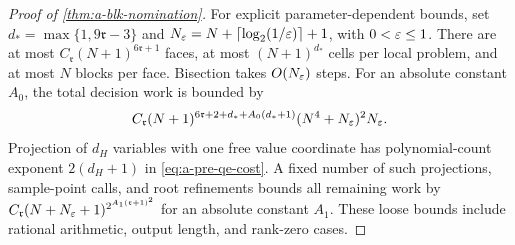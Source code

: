 \begin{proof}[Proof of \cref{thm:a-blk-nomination}]
For explicit parameter-dependent bounds, set
$d_* =\max\{1,9\mathfrak r-3\}$ and
$N_\varepsilon=N+\lceil\log_2(1/\varepsilon)\rceil+1$, with $0<\varepsilon\le1$.
There are at most $C_{\mathfrak r}(N+1)^{6\mathfrak r+1}$ faces,
at most $(N+1)^{d_*}$ cells per local problem, and at most $N$ blocks
per face. Bisection takes $O(N_\varepsilon)$ steps. For an absolute constant
$A_0$, the total decision work is bounded by
\[
 C_{\mathfrak r}(N+1)^{6\mathfrak r+2+d_*+A_0(d_*+1)}
 (N^4+N_\varepsilon)^2N_\varepsilon.
\]
Projection of $d_H$ variables with one free value coordinate has
polynomial-count exponent $2(d_H+1)$ in \cref{eq:a-pre-qe-cost}.
A fixed number of such projections, sample-point calls, and root refinements
bounds all remaining work by
$C_{\mathfrak r}(N+N_\varepsilon+1)^{2^{A_1(\mathfrak r+1)^2}}$
for an absolute constant $A_1$. These loose bounds include rational
arithmetic, output length, and rank-zero cases.
\end{proof}

